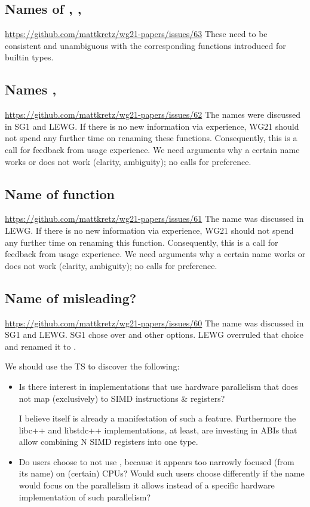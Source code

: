 \subsection{Names of , , }
\url{https://github.com/mattkretz/wg21-papers/issues/63}
These need to be consistent and unambiguous with the corresponding functions introduced for builtin types.

\subsection{Names , }
\url{https://github.com/mattkretz/wg21-papers/issues/62}
The names were discussed in SG1 and LEWG.
If there is no new information via experience, WG21 should not spend any further time on renaming these functions.
Consequently, this is a call for feedback from usage experience.
We need arguments why a certain name works or does not work (clarity, ambiguity); no calls for preference.

\subsection{Name of  function}
\url{https://github.com/mattkretz/wg21-papers/issues/61}
The name was discussed in LEWG.
If there is no new information via experience, WG21 should not spend any further time on renaming this function.
Consequently, this is a call for feedback from usage experience.
We need arguments why a certain name works or does not work (clarity, ambiguity); no calls for preference.

\subsection{Name of \simdT misleading?}
\url{https://github.com/mattkretz/wg21-papers/issues/60}
The name was discussed in SG1 and LEWG.
SG1 chose  over  and other options.
LEWG overruled that choice and renamed it to .

We should use the TS to discover the following:
\begin{itemize}
  \item Is there interest in implementations that use hardware parallelism that does not map (exclusively) to SIMD instructions \& registers?
    \begin{flushright}
      \smaller\color{gray}
      I believe  itself is already a manifestation of such a feature.
      Furthermore the libc++ and libstdc++ implementations, at least, are investing in ABIs that allow combining N SIMD registers into one  type.
    \end{flushright}
  \item Do users choose to not use , because it appears too narrowly focused (from its name) on (certain) CPUs?
    Would such users choose differently if the name would focus on the parallelism it allows instead of a specific hardware implementation of such parallelism?
\end{itemize}

